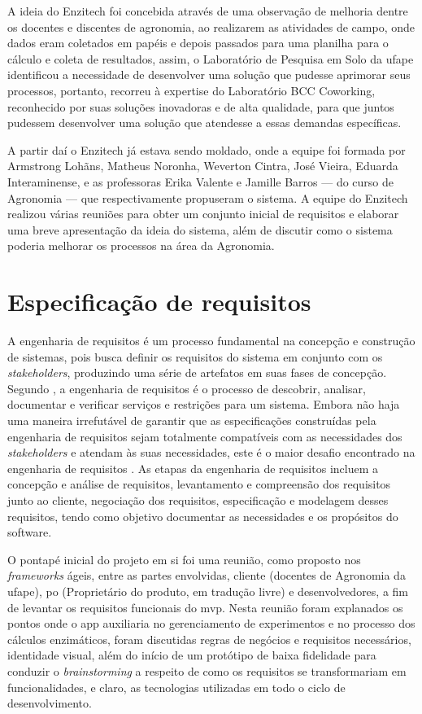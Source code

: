 A ideia do Enzitech foi concebida através de uma observação de melhoria dentre os docentes e discentes de agronomia, ao realizarem as atividades de campo, onde dados eram coletados em papéis e depois passados para uma planilha para o cálculo e coleta de resultados, assim, o Laboratório de Pesquisa em Solo da \ac{ufape} identificou a necessidade de desenvolver uma solução que pudesse aprimorar seus processos, portanto, recorreu à expertise do Laboratório BCC Coworking, reconhecido por suas soluções inovadoras e de alta qualidade, para que juntos pudessem desenvolver uma solução que atendesse a essas demandas específicas. 

A partir daí o Enzitech já estava sendo moldado, onde a equipe foi formada por Armstrong Lohãns, Matheus Noronha, Weverton Cintra, José Vieira, Eduarda Interaminense, e as professoras Erika Valente e Jamille Barros — do curso de Agronomia — que respectivamente propuseram o sistema. A equipe do Enzitech realizou várias reuniões para obter um conjunto inicial de requisitos e elaborar uma breve apresentação da ideia do sistema, além de discutir como o sistema poderia melhorar os processos na área da Agronomia.

\section{Especificação de requisitos}\label{sec:especificacao_de_requisitos}
A engenharia de requisitos é um processo fundamental na concepção e construção de sistemas, pois busca definir os requisitos do sistema em conjunto com os \textit{stakeholders}, produzindo uma série de artefatos em suas fases de concepção. Segundo \cite{kotonya1998requirements}, a engenharia de requisitos é o processo de descobrir, analisar, documentar e verificar serviços e restrições para um sistema. Embora não haja uma maneira irrefutável de garantir que as especificações construídas pela engenharia de requisitos sejam totalmente compatíveis com as necessidades dos \textit{stakeholders} e atendam às suas necessidades, este é o maior desafio encontrado na engenharia de requisitos \cite{pressman2016engenharia}. As etapas da engenharia de requisitos incluem a concepção e análise de requisitos, levantamento e compreensão dos requisitos junto ao cliente, negociação dos requisitos, especificação e modelagem desses requisitos, tendo como objetivo documentar as necessidades e os propósitos do software.

O pontapé inicial do projeto em si foi uma reunião, como proposto nos \textit{frameworks} ágeis, entre as partes envolvidas, cliente (docentes de Agronomia da \ac{ufape}), \ac{po} (Proprietário do produto, em tradução livre) e desenvolvedores, a fim de levantar os requisitos funcionais do \ac{mvp}. Nesta reunião foram explanados os pontos onde o \ac{app} auxiliaria no gerenciamento de experimentos e no processo dos cálculos enzimáticos, foram discutidas regras de negócios e requisitos necessários, identidade visual, além do início de um protótipo de baixa fidelidade para conduzir o \textit{brainstorming} a respeito de como os requisitos se transformariam em funcionalidades, e claro, as tecnologias utilizadas em todo o ciclo de desenvolvimento.

